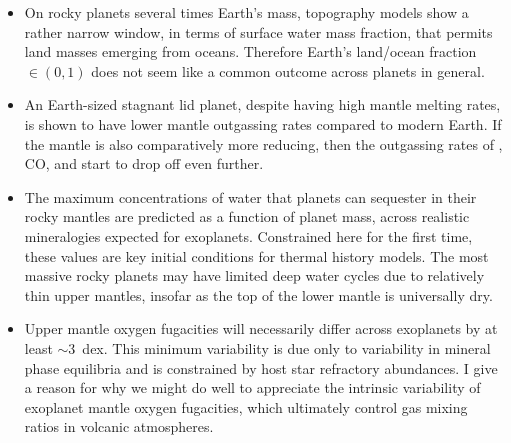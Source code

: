 \begin{itemize}

\item On rocky planets several times Earth's mass, topography models show a rather narrow window, in terms of surface water mass fraction, that permits land masses emerging from oceans. %
Therefore Earth's land/ocean fraction $\in (0,1)$ does not seem like a common outcome across planets in general.

\item An Earth-sized stagnant lid planet, despite having high mantle melting rates, is shown to have lower mantle outgassing rates compared to modern Earth. If the mantle is also comparatively more reducing, then the outgassing rates of , CO, and  start to drop off even further. %

\item The maximum concentrations of water that planets can sequester in their rocky mantles are predicted as a function of planet mass, across %
realistic mineralogies expected for exoplanets. Constrained here for the first time, these values are key initial conditions for thermal history models. %
The most massive rocky planets may have limited deep water cycles due to relatively thin upper mantles, insofar as the top of the lower mantle is universally dry. 

\item Upper mantle oxygen fugacities will necessarily differ across exoplanets by at least $\sim$3~dex. This minimum variability is due only to variability in mineral phase equilibria and is constrained by host star refractory abundances.  %
I give a reason for why we might do well to appreciate the intrinsic variability of exoplanet mantle oxygen fugacities, which ultimately control gas mixing ratios in volcanic atmospheres.

\end{itemize}




